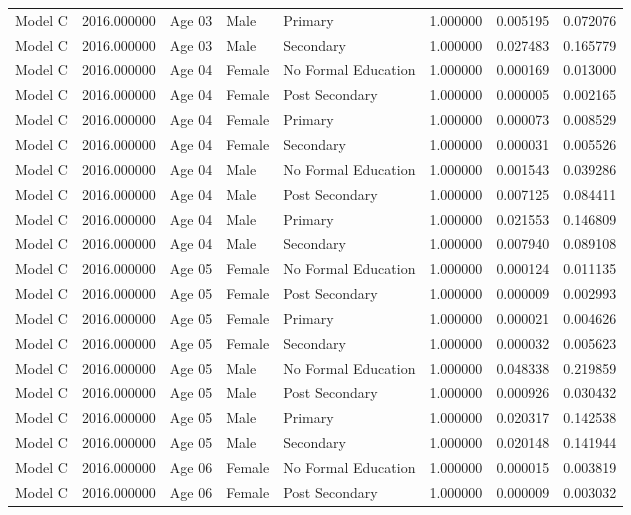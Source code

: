 \begin{table}[ht]
\begin{tabular}{lrlllrrr}
Model C & 2016.000000 & Age 03 & Male & Primary & 1.000000 & 0.005195 & 0.072076 \\
Model C & 2016.000000 & Age 03 & Male & Secondary & 1.000000 & 0.027483 & 0.165779 \\
Model C & 2016.000000 & Age 04 & Female & No Formal Education & 1.000000 & 0.000169 & 0.013000 \\
Model C & 2016.000000 & Age 04 & Female & Post Secondary & 1.000000 & 0.000005 & 0.002165 \\
Model C & 2016.000000 & Age 04 & Female & Primary & 1.000000 & 0.000073 & 0.008529 \\
Model C & 2016.000000 & Age 04 & Female & Secondary & 1.000000 & 0.000031 & 0.005526 \\
Model C & 2016.000000 & Age 04 & Male & No Formal Education & 1.000000 & 0.001543 & 0.039286 \\
Model C & 2016.000000 & Age 04 & Male & Post Secondary & 1.000000 & 0.007125 & 0.084411 \\
Model C & 2016.000000 & Age 04 & Male & Primary & 1.000000 & 0.021553 & 0.146809 \\
Model C & 2016.000000 & Age 04 & Male & Secondary & 1.000000 & 0.007940 & 0.089108 \\
Model C & 2016.000000 & Age 05 & Female & No Formal Education & 1.000000 & 0.000124 & 0.011135 \\
Model C & 2016.000000 & Age 05 & Female & Post Secondary & 1.000000 & 0.000009 & 0.002993 \\
Model C & 2016.000000 & Age 05 & Female & Primary & 1.000000 & 0.000021 & 0.004626 \\
Model C & 2016.000000 & Age 05 & Female & Secondary & 1.000000 & 0.000032 & 0.005623 \\
Model C & 2016.000000 & Age 05 & Male & No Formal Education & 1.000000 & 0.048338 & 0.219859 \\
Model C & 2016.000000 & Age 05 & Male & Post Secondary & 1.000000 & 0.000926 & 0.030432 \\
Model C & 2016.000000 & Age 05 & Male & Primary & 1.000000 & 0.020317 & 0.142538 \\
Model C & 2016.000000 & Age 05 & Male & Secondary & 1.000000 & 0.020148 & 0.141944 \\
Model C & 2016.000000 & Age 06 & Female & No Formal Education & 1.000000 & 0.000015 & 0.003819 \\
Model C & 2016.000000 & Age 06 & Female & Post Secondary & 1.000000 & 0.000009 & 0.003032 \\

\end{tabular}
\end{table}
